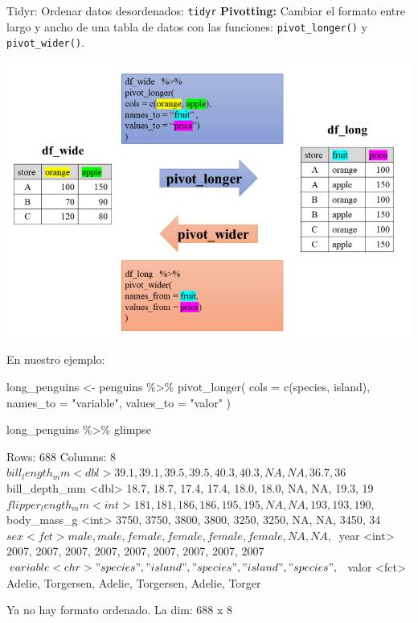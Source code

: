 \documentclass[
  ignorenonframetext,
  aspectratio=169]{beamer}
\newenvironment{Shaded}{\begin{snugshade}}{\end{snugshade}}
\newcommand{\AttributeTok}[1]{\textcolor[rgb]{0.77,0.63,0.00}{#1}}
\newcommand{\FunctionTok}[1]{\textcolor[rgb]{0.00,0.00,0.00}{#1}}
\newcommand{\NormalTok}[1]{#1}
\newcommand{\OtherTok}[1]{\textcolor[rgb]{0.56,0.35,0.01}{#1}}
\newcommand{\SpecialCharTok}[1]{\textcolor[rgb]{0.00,0.00,0.00}{#1}}
\newcommand{\StringTok}[1]{\textcolor[rgb]{0.31,0.60,0.02}{#1}}
\let\oldverbatim\verbatim
\let\endoldverbatim\endverbatim
\renewenvironment{verbatim}{\tiny\oldverbatim}{\endoldverbatim}
\begin{document}
\begin{frame}[fragile]{Tidyr: Ordenar datos desordenados:
\texttt{tidyr}}
\protect\hypertarget{tidyr-ordenar-datos-desordenados-tidyr-1}{}
\textbf{Pivotting:} Cambiar el formato entre largo y ancho de una tabla
de datos con las funciones: \texttt{pivot\_longer()} y
\texttt{pivot\_wider()}.

\begin{center}\includegraphics[width=0.5\linewidth]{Imgs/pivotting} \end{center}
\end{frame}

\begin{frame}[fragile]
En nuestro ejemplo:

\begin{Shaded}
\begin{Highlighting}[]
\NormalTok{long\_penguins }\OtherTok{\textless{}{-}}\NormalTok{ penguins }\SpecialCharTok{\%\textgreater{}\%} 
  \FunctionTok{pivot\_longer}\NormalTok{(}
    \AttributeTok{cols =} \FunctionTok{c}\NormalTok{(species, island),}
    \AttributeTok{names\_to =} \StringTok{"variable"}\NormalTok{, }\AttributeTok{values\_to =} \StringTok{"valor"}
\NormalTok{  )}

\NormalTok{long\_penguins }\SpecialCharTok{\%\textgreater{}\%}\NormalTok{ glimpse}
\end{Highlighting}
\end{Shaded}

\begin{verbatim}
Rows: 688
Columns: 8
$ bill_length_mm    <dbl> 39.1, 39.1, 39.5, 39.5, 40.3, 40.3, NA, NA, 36.7, 36~
$ bill_depth_mm     <dbl> 18.7, 18.7, 17.4, 17.4, 18.0, 18.0, NA, NA, 19.3, 19~
$ flipper_length_mm <int> 181, 181, 186, 186, 195, 195, NA, NA, 193, 193, 190,~
$ body_mass_g       <int> 3750, 3750, 3800, 3800, 3250, 3250, NA, NA, 3450, 34~
$ sex               <fct> male, male, female, female, female, female, NA, NA, ~
$ year              <int> 2007, 2007, 2007, 2007, 2007, 2007, 2007, 2007, 2007~
$ variable          <chr> "species", "island", "species", "island", "species",~
$ valor             <fct> Adelie, Torgersen, Adelie, Torgersen, Adelie, Torger~
\end{verbatim}

Ya no hay formato ordenado. La dim: 688 x 8
\end{frame}
\end{document}
